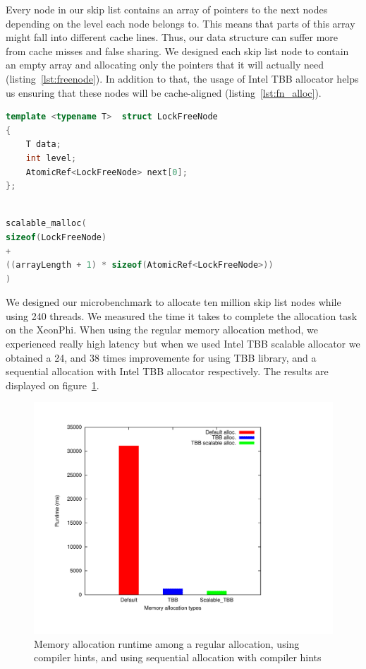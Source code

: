 Every node in our skip list contains an array of pointers to the next nodes depending on the level each node belongs to. This means that parts of this array might fall into different cache lines. Thus, our data structure can suffer more from cache misses and false sharing. We designed each skip list node to contain an empty array and allocating only the pointers that it will actually need (listing~\ref{lst:freenode}). In addition to that, the usage of Intel TBB allocator helps us ensuring that these nodes will be cache-aligned (listing~\ref{lst:fn_alloc}).

\begin{lstlisting}[language=C++,basicstyle=\tt\footnotesize,captionpos=b,caption=Lock free node structure,label=lst:freenode,morekeywords={*, size_t}]
template <typename T>  struct LockFreeNode
{	
	T data;
	int	level;
	AtomicRef<LockFreeNode>	next[0];
};
\end{lstlisting}

\begin{lstlisting}[language=C++,basicstyle=\tt\footnotesize,captionpos=b,caption=Memory allocation instruction for array of atomic references,label=lst:fn_alloc, morekeywords={*, size_t}]

scalable_malloc(
sizeof(LockFreeNode) 
+ 
((arrayLength + 1) * sizeof(AtomicRef<LockFreeNode>))
)
\end{lstlisting}

We designed our microbenchmark to allocate ten million skip list nodes while using 240 threads. We measured the time it takes to complete the allocation task on the XeonPhi. When using the regular memory allocation method, we experienced really high latency but when we used Intel TBB scalable allocator we obtained a 24, and 38 times improvemente for using TBB library, and a sequential allocation with Intel TBB allocator respectively. The results are displayed on figure~\ref{fig:mem_alloc}.


\begin{figure}
	\centering
  	\includegraphics[scale=0.35]{../plots/mem_alloc/mem_alloc.pdf}
	\caption{Memory allocation runtime among a regular allocation, using compiler hints, and using sequential allocation with compiler hints}
	\label{fig:mem_alloc}
\end{figure}
